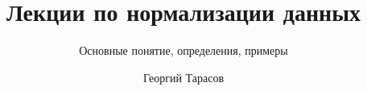 \documentclass{beamer}
\title{Лекции по нормализации данных}
\subtitle{Основные понятие, определения, примеры}
\author{Георгий Тарасов}
\begin{document}
\begin{frame}
\titlepage
\end{frame}


\end{document}
